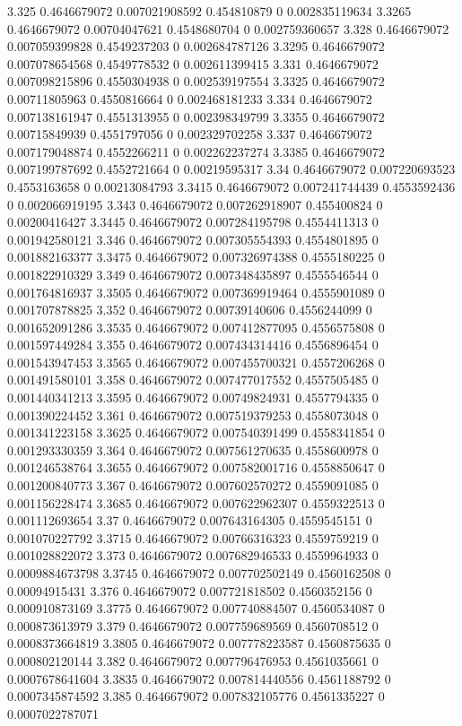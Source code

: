 {3.325 0.4646679072 0.007021908592 0.454810879 0 0.002835119634
3.3265 0.4646679072 0.00704047621 0.4548680704 0 0.002759360657
3.328 0.4646679072 0.007059399828 0.4549237203 0 0.002684787126
3.3295 0.4646679072 0.007078654568 0.4549778532 0 0.002611399415
3.331 0.4646679072 0.007098215896 0.4550304938 0 0.002539197554
3.3325 0.4646679072 0.00711805963 0.4550816664 0 0.002468181233
3.334 0.4646679072 0.007138161947 0.4551313955 0 0.002398349799
3.3355 0.4646679072 0.00715849939 0.4551797056 0 0.002329702258
3.337 0.4646679072 0.007179048874 0.4552266211 0 0.002262237274
3.3385 0.4646679072 0.007199787692 0.4552721664 0 0.00219595317
3.34 0.4646679072 0.007220693523 0.4553163658 0 0.00213084793
3.3415 0.4646679072 0.007241744439 0.4553592436 0 0.002066919195
3.343 0.4646679072 0.007262918907 0.455400824 0 0.00200416427
3.3445 0.4646679072 0.007284195798 0.4554411313 0 0.001942580121
3.346 0.4646679072 0.007305554393 0.4554801895 0 0.001882163377
3.3475 0.4646679072 0.007326974388 0.4555180225 0 0.001822910329
3.349 0.4646679072 0.007348435897 0.4555546544 0 0.001764816937
3.3505 0.4646679072 0.007369919464 0.4555901089 0 0.001707878825
3.352 0.4646679072 0.00739140606 0.4556244099 0 0.001652091286
3.3535 0.4646679072 0.007412877095 0.4556575808 0 0.001597449284
3.355 0.4646679072 0.007434314416 0.4556896454 0 0.001543947453
3.3565 0.4646679072 0.007455700321 0.4557206268 0 0.001491580101
3.358 0.4646679072 0.007477017552 0.4557505485 0 0.001440341213
3.3595 0.4646679072 0.00749824931 0.4557794335 0 0.001390224452
3.361 0.4646679072 0.007519379253 0.4558073048 0 0.001341223158
3.3625 0.4646679072 0.007540391499 0.4558341854 0 0.001293330359
3.364 0.4646679072 0.007561270635 0.4558600978 0 0.001246538764
3.3655 0.4646679072 0.007582001716 0.4558850647 0 0.001200840773
3.367 0.4646679072 0.007602570272 0.4559091085 0 0.001156228474
3.3685 0.4646679072 0.007622962307 0.4559322513 0 0.001112693654
3.37 0.4646679072 0.007643164305 0.4559545151 0 0.001070227792
3.3715 0.4646679072 0.00766316323 0.4559759219 0 0.001028822072
3.373 0.4646679072 0.007682946533 0.4559964933 0 0.0009884673798
3.3745 0.4646679072 0.007702502149 0.4560162508 0 0.00094915431
3.376 0.4646679072 0.007721818502 0.4560352156 0 0.000910873169
3.3775 0.4646679072 0.007740884507 0.4560534087 0 0.000873613979
3.379 0.4646679072 0.007759689569 0.4560708512 0 0.0008373664819
3.3805 0.4646679072 0.007778223587 0.4560875635 0 0.000802120144
3.382 0.4646679072 0.007796476953 0.4561035661 0 0.0007678641604
3.3835 0.4646679072 0.007814440556 0.4561188792 0 0.0007345874592
3.385 0.4646679072 0.007832105776 0.4561335227 0 0.0007022787071
}
